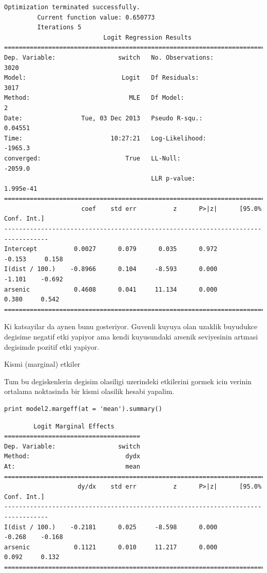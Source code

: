 \documentclass[12pt,fleqn]{article}\usepackage{../common}
\begin{document}
\begin{verbatim}
Optimization terminated successfully.
         Current function value: 0.650773
         Iterations 5
                           Logit Regression Results                           
==============================================================================
Dep. Variable:                 switch   No. Observations:                 3020
Model:                          Logit   Df Residuals:                     3017
Method:                           MLE   Df Model:                            2
Date:                Tue, 03 Dec 2013   Pseudo R-squ.:                 0.04551
Time:                        10:27:21   Log-Likelihood:                -1965.3
converged:                       True   LL-Null:                       -2059.0
                                        LLR p-value:                 1.995e-41
==================================================================================
                     coef    std err          z      P>|z|      [95.0% Conf. Int.]
----------------------------------------------------------------------------------
Intercept          0.0027      0.079      0.035      0.972        -0.153     0.158
I(dist / 100.)    -0.8966      0.104     -8.593      0.000        -1.101    -0.692
arsenic            0.4608      0.041     11.134      0.000         0.380     0.542
==================================================================================
\end{verbatim}

Ki katsayilar da aynen bunu gosteriyor. Guvenli kuyuya olan uzaklik buyudukce
degisime negatif etki yapiyor ama kendi kuyusundaki arsenik seviyesinin artmasi
degisimde pozitif etki yapiyor.

Kismi (marginal) etkiler

Tum bu degiskenlerin degisim olasiligi uzerindeki etkilerini gormek icin
verinin ortalama noktasinda bir kismi olasilik hesabi yapalim. 

\begin{verbatim}
print model2.margeff(at = 'mean').summary()
\end{verbatim}

\begin{verbatim}
        Logit Marginal Effects       
=====================================
Dep. Variable:                 switch
Method:                          dydx
At:                              mean
==================================================================================
                    dy/dx    std err          z      P>|z|      [95.0% Conf. Int.]
----------------------------------------------------------------------------------
I(dist / 100.)    -0.2181      0.025     -8.598      0.000        -0.268    -0.168
arsenic            0.1121      0.010     11.217      0.000         0.092     0.132
==================================================================================
\end{verbatim}
\end{document}
